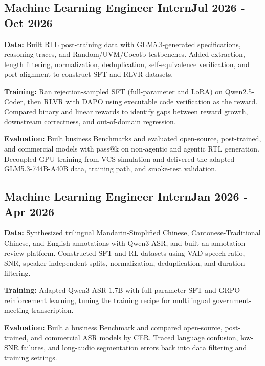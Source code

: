 \documentclass[letter,12pt]{article}
\begin{document}
\vspace*{10pt}
\subsection{{Machine Learning Engineer Intern}\hfill Jul 2026 - Oct 2026}
\begin{zitemize}
\item \textbf{Data:} Built RTL post-training data with GLM5.3-generated specifications, reasoning traces, and Random/UVM/Cocotb testbenches. Added extraction, length filtering, normalization, deduplication, self-equivalence verification, and port alignment to construct SFT and RLVR datasets.
\item \textbf{Training:} Ran rejection-sampled SFT (full-parameter and LoRA) on Qwen2.5-Coder, then RLVR with DAPO using executable code verification as the reward. Compared binary and linear rewards to identify gaps between reward growth, downstream correctness, and out-of-domain regression.
\item \textbf{Evaluation:} Built business Benchmarks and evaluated open-source, post-trained, and commercial models with pass@k on non-agentic and agentic RTL generation. Decoupled GPU training from VCS simulation and delivered the adapted GLM5.3-744B-A40B data, training path, and smoke-test validation.
\end{zitemize}

\vspace*{6pt}
\subsection{{Machine Learning Engineer Intern}\hfill Jan 2026 - Apr 2026}
\begin{zitemize}
\item \textbf{Data:} Synthesized trilingual Mandarin-Simplified Chinese, Cantonese-Traditional Chinese, and English annotations with Qwen3-ASR, and built an annotation-review platform. Constructed SFT and RL datasets using VAD speech ratio, SNR, speaker-independent splits, normalization, deduplication, and duration filtering.
\item \textbf{Training:} Adapted Qwen3-ASR-1.7B with full-parameter SFT and GRPO reinforcement learning, tuning the training recipe for multilingual government-meeting transcription.
\item \textbf{Evaluation:} Built a business Benchmark and compared open-source, post-trained, and commercial ASR models by CER. Traced language confusion, low-SNR failures, and long-audio segmentation errors back into data filtering and training settings.
\end{zitemize}
\end{document}
